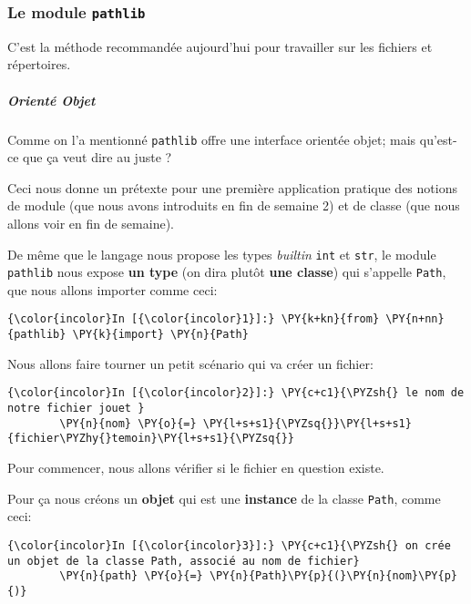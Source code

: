     \hypertarget{le-module-pathlib}{%
\subsubsection{\texorpdfstring{Le module
\texttt{pathlib}}{Le module pathlib}}\label{le-module-pathlib}}

    C'est la méthode recommandée aujourd'hui pour travailler sur les
fichiers et répertoires.

    \hypertarget{orientuxe9-objet}{%
\subparagraph{Orienté Objet}\label{orientuxe9-objet}}

    Comme on l'a mentionné \texttt{pathlib} offre une interface orientée
objet; mais qu'est-ce que ça veut dire au juste ?

Ceci nous donne un prétexte pour une première application pratique des
notions de module (que nous avons introduits en fin de semaine 2) et de
classe (que nous allons voir en fin de semaine).

    De même que le langage nous propose les types \emph{builtin}
\texttt{int} et \texttt{str}, le module \texttt{pathlib} nous expose
\textbf{un type} (on dira plutôt \textbf{une classe}) qui s'appelle
\texttt{Path}, que nous allons importer comme ceci:

    \begin{Verbatim}[commandchars=\\\{\},frame=single,framerule=0.3mm,rulecolor=\color{cellframecolor}]
{\color{incolor}In [{\color{incolor}1}]:} \PY{k+kn}{from} \PY{n+nn}{pathlib} \PY{k}{import} \PY{n}{Path}
\end{Verbatim}


    Nous allons faire tourner un petit scénario qui va créer un fichier:

    \begin{Verbatim}[commandchars=\\\{\},frame=single,framerule=0.3mm,rulecolor=\color{cellframecolor}]
{\color{incolor}In [{\color{incolor}2}]:} \PY{c+c1}{\PYZsh{} le nom de notre fichier jouet }
        \PY{n}{nom} \PY{o}{=} \PY{l+s+s1}{\PYZsq{}}\PY{l+s+s1}{fichier\PYZhy{}temoin}\PY{l+s+s1}{\PYZsq{}}
\end{Verbatim}


    Pour commencer, nous allons vérifier si le fichier en question existe.

Pour ça nous créons un \textbf{objet} qui est une \textbf{instance} de
la classe \texttt{Path}, comme ceci:

    \begin{Verbatim}[commandchars=\\\{\},frame=single,framerule=0.3mm,rulecolor=\color{cellframecolor}]
{\color{incolor}In [{\color{incolor}3}]:} \PY{c+c1}{\PYZsh{} on crée un objet de la classe Path, associé au nom de fichier}
        \PY{n}{path} \PY{o}{=} \PY{n}{Path}\PY{p}{(}\PY{n}{nom}\PY{p}{)}
\end{Verbatim}


